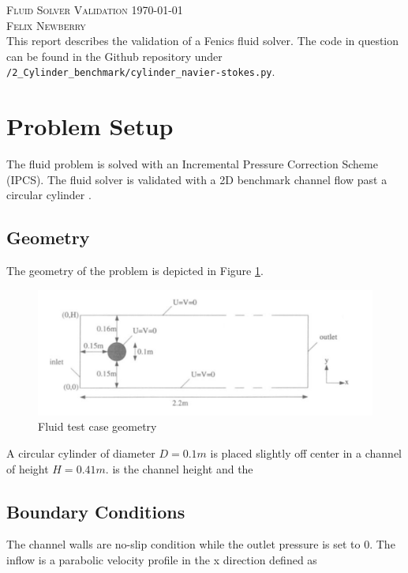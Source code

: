 \documentclass{article}
\begin{document}
\textsc{\Large Fluid Solver Validation \hfill \today}\\[0.5cm] %
\textsc{\large Felix Newberry}\\

This report describes the validation of a Fenics fluid solver. The code in question can be found in the Github repository under \verb|/2_Cylinder_benchmark/cylinder_navier-stokes.py|. 

\section{Problem Setup} 

The fluid problem is solved with an Incremental Pressure Correction Scheme (IPCS). The fluid solver is validated with a 2D benchmark channel flow past a circular cylinder \cite{schafer1996benchmark}. 

\subsection{Geometry}
The geometry of the problem is depicted in Figure \ref{fig:geom}. 

\FloatBarrier
\begin{figure}[h]
\centering
	\includegraphics[width=\textwidth]{geometry}
	\caption{Fluid test case geometry \cite{schafer1996benchmark}}
	\label{fig:geom}
\end{figure}
\FloatBarrier

A circular cylinder of diameter $D = 0.1 m$ is placed slightly off center in a channel of height $H = 0.41 m$.  is the channel height and  the 

\subsection{Boundary Conditions}
The channel walls are no-slip condition while the outlet pressure is set to 0. The inflow is a parabolic velocity profile in the x direction defined as 
\end{document}
